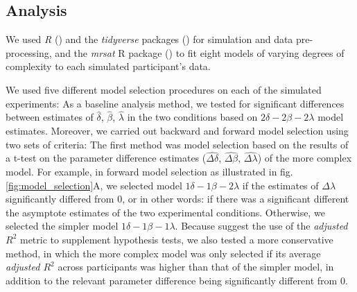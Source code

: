 \documentclass[10pt,letterpaper]{article}
\begin{document}
\subsection{Analysis}\label{analysis}

We used \textit{R} () and the \textit{tidyverse} packages () for simulation and data pre-processing, and the \textit{mrsat} R package () to fit eight models of varying degrees of complexity to each simulated participant's data.

We used five different model selection procedures on each of the simulated experiments:
As a baseline analysis method, we tested for significant differences between estimates of $\hat{\delta}$, $\hat{\beta}$, $\hat{\lambda}$ in the two conditions based on $2\delta-2\beta-2\lambda$ model estimates.
Moreover, we carried out backward and forward model selection using two sets of criteria:
The first method was model selection based on the results of a t-test on the parameter difference estimates ($\hat{\Delta\delta}$, $\hat{\Delta\beta}$, $\hat{\Delta\lambda}$) of the more complex model. For example, in forward model selection as illustrated in fig. \ref{fig:model_selection}A, we selected model $1\delta-1\beta-2\lambda$ if the estimates of $\Delta\lambda$ significantly differed from $0$, or in other words: if there was a significant different the asymptote estimates of the two experimental conditions. Otherwise, we selected the simpler model $1\delta-1\beta-1\lambda$.
Because \cite{Foraker2018} suggest the use of the \textit{adjusted $R^2$} metric to supplement hypothesis tests, we also tested a more conservative method, in which the more complex model was only selected if its average \textit{adjusted $R^2$} across participants was higher than that of the simpler model, in addition to the relevant parameter difference being significantly different from $0$.
\end{document}
